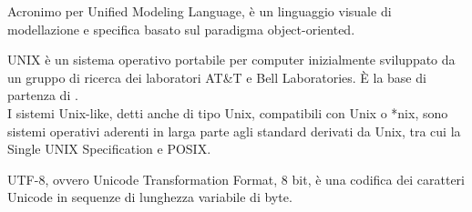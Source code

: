 Acronimo per Unified Modeling Language, è un linguaggio visuale di modellazione e specifica basato sul paradigma object-oriented.

UNIX è un sistema operativo portabile per computer inizialmente sviluppato da un gruppo di ricerca dei laboratori AT\&T e Bell Laboratories. \`{E} la base di partenza di .\\
I sistemi Unix-like, detti anche di tipo Unix, compatibili con Unix o *nix, sono sistemi operativi aderenti in larga parte agli standard derivati da Unix, tra cui la Single UNIX Specification e POSIX.

UTF-8, ovvero Unicode Transformation Format, 8 bit, è una codifica dei caratteri Unicode in sequenze di lunghezza variabile di byte.
\clearpage